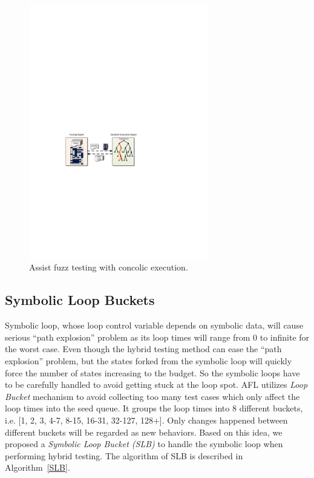 \begin{figure}
\centering
\includegraphics[width=0.7\textwidth]{figures/s2e-assist.pdf} 
\caption{Assist fuzz testing with concolic execution.}\label{s2e-assist}
\end{figure}


\subsection{Symbolic Loop Buckets}
Symbolic loop, whose loop control variable depends on symbolic data, will cause serious ``path explosion'' problem as its loop times will range from 0 to infinite for the worst case. 
Even though the hybrid testing method can ease the ``path explosion'' problem, but the states forked from the symbolic loop will quickly force the number of states increasing to the budget. So the symbolic loops have to be carefully handled to avoid getting stuck at the loop spot. AFL utilizes \emph{Loop Bucket} mechanism to avoid collecting too many test cases which only affect the loop times into the seed queue. It groups the loop times into 8 different buckets, i.e. [1, 2, 3, 4-7, 8-15, 16-31, 32-127, 128+]. Only changes happened between different buckets will be regarded as new behaviors. Based on this idea, we proposed a \textit{Symbolic Loop Bucket (SLB)} to handle the symbolic loop when performing hybrid testing. The algorithm of SLB is described in Algorithm~\ref{SLB}.

